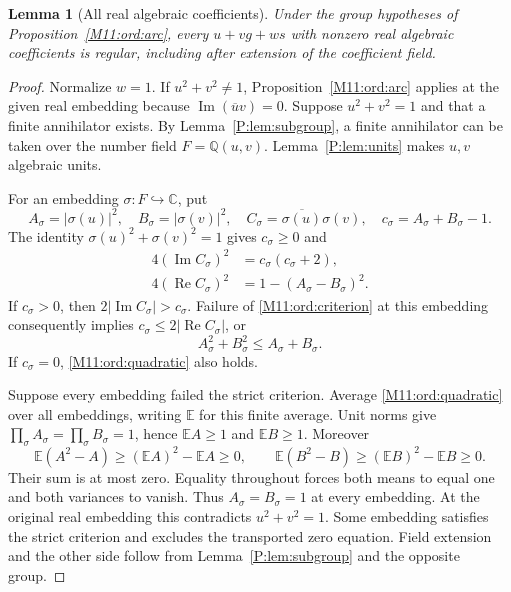 \documentclass[11pt,a4paper,oneside]{report}
\newtheorem{lemma}[theorem]{Lemma}
\theoremstyle{definition}
\theoremstyle{remark}
\newcommand{\C}{\mathbb C}
\newcommand{\Q}{\mathbb Q}
\begin{document}
\begin{lemma}[All real algebraic coefficients]\label{M11:ord:realalg}
Under the group hypotheses of Proposition~\ref{M11:ord:arc}, every
$u+vg+ws$ with nonzero real algebraic coefficients is regular,
including after extension of the coefficient field.
\end{lemma}
\begin{proof}
Normalize $w=1$. If $u^2+v^2\ne1$, Proposition~\ref{M11:ord:arc}
applies at the given real embedding because
$\operatorname{Im}(\overline uv)=0$. Suppose $u^2+v^2=1$ and that
a finite annihilator exists. By Lemma~\ref{P:lem:subgroup}, a finite
annihilator can be taken over the number field $F=\Q(u,v)$.
Lemma~\ref{P:lem:units} makes $u,v$ algebraic units.

For an embedding $\sigma:F\hookrightarrow\C$, put
\[
 A_\sigma=|\sigma(u)|^2,\quad B_\sigma=|\sigma(v)|^2,
 \quad C_\sigma=\overline{\sigma(u)}\sigma(v),\quad
 c_\sigma=A_\sigma+B_\sigma-1.
\]
The identity $\sigma(u)^2+\sigma(v)^2=1$ gives $c_\sigma\ge0$ and
\begin{align*}
 4(\operatorname{Im}C_\sigma)^2&=c_\sigma(c_\sigma+2),\\
 4(\operatorname{Re}C_\sigma)^2&=1-(A_\sigma-B_\sigma)^2.
\end{align*}
If $c_\sigma>0$, then $2|\operatorname{Im}C_\sigma|>c_\sigma$.
Failure of \eqref{M11:ord:criterion} at this embedding consequently
implies $c_\sigma\le2|\operatorname{Re}C_\sigma|$, or
\begin{equation}\label{M11:ord:quadratic}
 A_\sigma^2+B_\sigma^2\le A_\sigma+B_\sigma.
\end{equation}
If $c_\sigma=0$, \eqref{M11:ord:quadratic} also holds.

Suppose every embedding failed the strict criterion. Average
\eqref{M11:ord:quadratic} over all embeddings, writing $\mathbb E$
for this finite average. Unit norms give
$\prod_\sigma A_\sigma=\prod_\sigma B_\sigma=1$, hence
$\mathbb EA\ge1$ and $\mathbb EB\ge1$. Moreover
\[
 \mathbb E(A^2-A)\ge(\mathbb EA)^2-\mathbb EA\ge0,
 \qquad
 \mathbb E(B^2-B)\ge(\mathbb EB)^2-\mathbb EB\ge0.
\]
Their sum is at most zero. Equality throughout forces both means
to equal one and both variances to vanish. Thus $A_\sigma=B_\sigma=1$
at every embedding. At the original real embedding this contradicts
$u^2+v^2=1$. Some embedding satisfies the strict criterion and
excludes the transported zero equation. Field extension and the
other side follow from Lemma~\ref{P:lem:subgroup} and the opposite group.
\end{proof}
\end{document}
